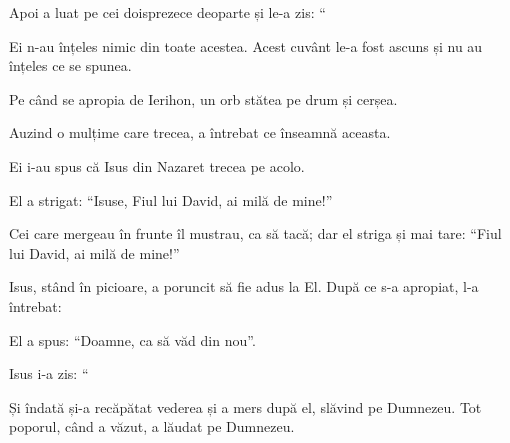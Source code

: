 {\par }{\PP {}Apoi a luat pe cei doisprezece deoparte și le-a zis: “{}




\par }{\PP {}Ei n-au înțeles nimic din toate acestea. Acest cuvânt le-a fost ascuns și nu au înțeles ce se spunea.


\par }{\PP {}Pe când se apropia de Ierihon, un orb stătea pe drum și cerșea.

Auzind o mulțime care trecea, a întrebat ce înseamnă aceasta.

Ei i-au spus că Isus din Nazaret trecea pe acolo.

El a strigat: “Isuse, Fiul lui David, ai milă de mine!”

Cei care mergeau în frunte îl mustrau, ca să tacă; dar el striga și mai tare: “Fiul lui David, ai milă de mine!”


\par }{\PP {}Isus, stând în picioare, a poruncit să fie adus la El. După ce s-a apropiat, l-a întrebat:


\par }{\PP El a spus: “Doamne, ca să văd din nou”.


\par }{\PP {}Isus i-a zis: “{}


\par }{\PP {}Și îndată și-a recăpătat vederea și a mers după el, slăvind pe Dumnezeu. Tot poporul, când a văzut, a lăudat pe Dumnezeu.



\par }

